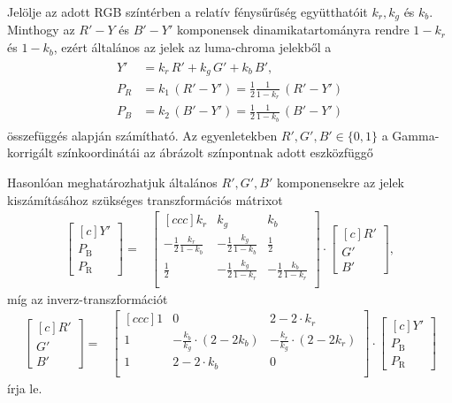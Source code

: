 Jelölje az adott RGB színtérben a relatív fénysűrűség együtthatóit $k_r, k_g$ és $k_b$.
Minthogy az $R'-Y$ és $B'-Y'$ komponensek dinamikatartományra rendre $1 - k_r$ és $1 - k_b$, ezért általános az \ypbpr jelek az luma-chroma jelekből a
\begin{align}
\begin{split}
Y' &= k_r \, R' + k_g \, G' + k_b \, B' ,\\
P_R &= k_1 \, \left( R' - Y' \right) = \frac{1}{2} \frac{1}{1 - k_r} \, \left( R' - Y' \right)\\
P_B &=  k_2 \, \left( B' - Y' \right) = \frac{1}{2} \frac{1}{1 - k_b} \, \left( B' - Y' \right)
\end{split}
\end{align}
összefüggés alapján számítható.
Az egyenletekben $R', G', B'  \in \lbrace 0, 1 \rbrace$ a Gamma-korrigált színkoordinátái az ábrázolt színpontnak adott eszközfüggő

Hasonlóan meghatározhatjuk általános $R',G',B'$ komponensekre az \ypbpr jelek kiszámításához szükséges transzformációs mátrixot
\begin{align}
\begin{bmatrix}[c]
       Y' \\[0.3em]
       P_{\mathrm{B}} \\[0.3em]
       P_{\mathrm{R}} \end{bmatrix}
       =& 
  \begin{bmatrix}[c c c]
   k_r & k_g & k_b  \\
   -\frac{1}{2}\frac{k_r}{1-k_b} & -\frac{1}{2}\frac{k_g}{1-k_b} & \frac{1}{2} \\
   \frac{1}{2}& -\frac{1}{2}\frac{k_g}{1-k_r} & -\frac{1}{2}\frac{k_b}{1-k_r} \\
\end{bmatrix}
\cdot
\begin{bmatrix}[c]
       R' \\[0.3em]
       G' \\[0.3em]
       B' \end{bmatrix},
\end{align}
míg az inverz-transzformációt 
\begin{align}
\begin{bmatrix}[c]
       R' \\[0.3em]
       G' \\[0.3em]
       B' \end{bmatrix}
       =& 
  \begin{bmatrix}[c c c]
   1 & 0 & 2 - 2 \cdot k_r  \\
   1 & -\frac{k_b}{k_g} \cdot (2-2k_b) &  -\frac{k_r}{k_g} \cdot (2-2k_r)  \\
   1 & 2 - 2 \cdot k_b & 0 \\
\end{bmatrix}
\cdot       \begin{bmatrix}[c]
       Y' \\[0.3em]
       P_{\mathrm{B}} \\[0.3em]
       P_{\mathrm{R}} \end{bmatrix}
\end{align}
írja le.


